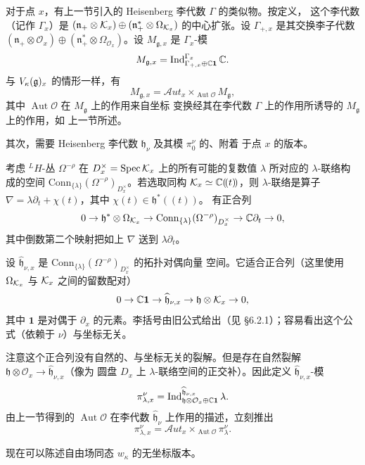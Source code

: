 对于点 $x$，有上一节引入的 Heisenberg 李代数 $\Gamma$ 的类似物。按定义，
这个李代数（记作 $\Gamma_x$）是
$(\mathfrak n_+\otimes\mathcal{K}_x)\oplus(\mathfrak n^*_+\otimes\Omega_{\mathcal{K}_x})$
的中心扩张。设 $\Gamma_{+,x}$ 是其交换李子代数
$(\mathfrak n_+\otimes\mathcal O_x)\oplus(\mathfrak n^*_+\otimes
\Omega_{\mathcal O_x})$。设 $M_{\mathfrak g,x}$ 是 $\Gamma_x$-模
\[
    M_{\mathfrak g,x}=\operatorname{Ind}_{\Gamma_{+,x}\oplus\mathbb{C}\mathbf 1}^{\Gamma_x}\mathbb{C}.
\]
与 $V_\kappa(\mathfrak{g})_x$ 的情形一样，有
\[
    M_{\mathfrak g,x}=\mathcal Aut_x\times_{\operatorname{Aut}\mathcal O}
    M_{\mathfrak g},
\]
其中 $\operatorname{Aut}\mathcal O$ 在 $M_{\mathfrak g}$ 上的作用来自坐标
变换经其在李代数 $\Gamma$ 上的作用所诱导的 $M_{\mathfrak g}$ 上的作用，如
上一节所述。

其次，需要 Heisenberg 李代数 $\mathfrak h_\nu$ 及其模 $\pi^\nu_0$ 的、附着
于点 $x$ 的版本。

考虑 $^LH$-丛 $\Omega^{-\rho}$ 在
$D^\times_x=\operatorname{Spec}\mathcal{K}_x$ 上的所有可能的复数值 $\lambda$ 所对应的
$\lambda$-联络构成的空间
$\mathrm{Conn}_{\{\lambda\}}(\Omega^{-\rho})_{D^\times_x}$。若选取同构
$\mathcal{K}_x\simeq\mathbb{C}(\!(t)\!)$，则 $\lambda$-联络是算子
$\nabla=\lambda\partial_t+\chi(t)$，其中 $\chi(t)\in\mathfrak h^*(\!(t)\!)$。
有正合列
\[
    0\to\mathfrak h^*\otimes\Omega_{\mathcal{K}_x}
    \to\mathrm{Conn}_{\{\lambda\}}(\Omega^{-\rho})_{D^\times_x}
    \to\mathbb{C}\partial_t\to0,
\]
其中倒数第二个映射把如上 $\nabla$ 送到 $\lambda\partial_t$。

设 $\widehat{\mathfrak h}_{\nu,x}$ 是
$\mathrm{Conn}_{\{\lambda\}}(\Omega^{-\rho})_{D^\times_x}$ 的拓扑对偶向量
空间。它适合正合列（这里使用 $\Omega_{\mathcal{K}_x}$ 与 $\mathcal{K}_x$ 之间的留数配对）
\[
    0\to\mathbb{C}\mathbf 1\to\widehat{\mathfrak h}_{\nu,x}
    \to\mathfrak h\otimes\mathcal{K}_x\to0,
\]
其中 $\mathbf 1$ 是对偶于 $\partial_x$ 的元素。李括号由旧公式给出（见
\S6.2.1）；容易看出这个公式（依赖于 $\nu$）与坐标无关。

注意这个正合列没有自然的、与坐标无关的裂解。但是存在自然裂解
$\mathfrak h\otimes\mathcal O_x\to\widehat{\mathfrak h}_{\nu,x}$（像为
圆盘 $D_x$ 上 $\lambda$-联络空间的正交补）。因此定义
$\widehat{\mathfrak h}_{\nu,x}$-模
\[
    \pi^\nu_{\lambda,x}
    =\operatorname{Ind}_{\mathfrak h\otimes\mathcal O_x\oplus\mathbb{C}\mathbf 1}
    ^{\widehat{\mathfrak h}_{\nu,x}}\lambda.
\]
由上一节得到的 $\operatorname{Aut}\mathcal O$ 在李代数
$\widehat{\mathfrak h}_\nu$ 上作用的描述，立刻推出
\[
    \pi^\nu_{\lambda,x}
    =\mathcal Aut_x\times_{\operatorname{Aut}\mathcal O}\pi^\nu_\lambda.
\]

现在可以陈述自由场同态 $w_\kappa$ 的无坐标版本。


